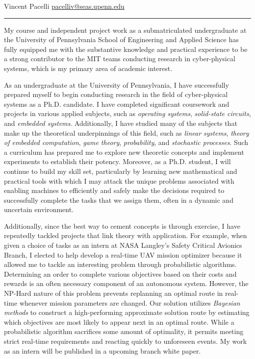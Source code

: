 \documentclass[11pt]{letter}
\title{}
\author{}
\begin{document}
\newcommand{\comm}[1]{}

Vincent Pacelli \hfill \hfill \href{mailto:pacelliv@seas.upenn.edu}{pacelliv@seas.upenn.edu}\\
\rule{\textwidth}{0.1pt}

My course and independent project work as a submatriculated undergraduate at the University of Pennsylvania School of Engineering and Applied Science has fully equipped me with the substantive knowledge and practical experience to be a strong contributor to the MIT teams conducting research in cyber-physical systems, which is my primary area of academic interest.

As an undergraduate at the University of Pennsylvania, I have successfully prepared myself to begin conducting research in the field of cyber-physical systems as a Ph.D. candidate. I have completed significant coursework and projects in various applied subjects, such as \emph{operating systems}, \emph{solid-state circuits}, and \emph{embedded systems}. Additionally, I have studied many of the subjects that make up the theoretical underpinnings of this field, such as \emph{linear systems}, \emph{theory of embedded computation}, \emph{game theory}, \emph{probability}, and \emph{stochastic processes}. Such a curriculum has prepared me to explore new theoretic concepts and implement experiments to establish their potency. Moreover, as a Ph.D. student, I will continue to build my skill set, particularly by learning new mathematical and practical tools with which I may attack the unique problems associated with enabling machines to efficiently and safely make the decisions required to successfully complete the tasks that we assign them, often in a dynamic and uncertain environment. 

Additionally, since the best way to cement concepts is through exercise, I have repeatedly tackled projects that link theory with application. For example, when given a choice of tasks as an intern at NASA Langley's Safety Critical Avionics Branch, I elected to help develop a real-time UAV mission optimizer because it allowed me to tackle an interesting problem through probabilistic algorithms. Determining an order to complete various objectives based on their costs and rewards is an often necessary component of an autonomous system. However, the NP-Hard nature of this problem prevents replanning an optimal route in real-time whenever mission parameters are changed. Our solution utilizes \emph{Bayesian methods} to construct a high-performing approximate solution route by estimating which objectives are most likely to appear next in an optimal route. While a probabilistic algorithm sacrifices some amount of optimality, it permits meeting strict real-time requirements and reacting quickly to unforeseen events. My work as an intern will be published in a upcoming branch white paper.
\end{document}
